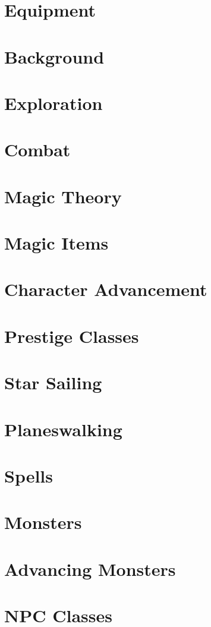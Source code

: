 \documentclass[12pt,oneside,onecolumn,openany,final]{memoir}
\begin{document}
\chapter{Equipment}
\clearpage{}
\chapter{Background}
\clearpage{}
\chapter{Exploration}
\clearpage{}
\chapter{Combat}
\clearpage{}
\chapter{Magic Theory}
\clearpage{}
\chapter{Magic Items}
\clearpage{}
\chapter{Character Advancement}
\clearpage{}
\chapter{Prestige Classes}
\clearpage{}
\chapter{Star Sailing}
\clearpage{}
\chapter{Planeswalking}

\appendix{}
\appendixpage{}

\clearpage{}
\chapter{Spells}
\clearpage{}
\chapter{Monsters}
\clearpage{}
\chapter{Advancing Monsters}
\clearpage{}
\chapter{NPC Classes}

\clearpage{}


\clearpage{}
\glsaddall{}
\printglossaries{}

\clearpage{}
\listoftables{}

\clearpage{}
\printindex{}
\end{document}
